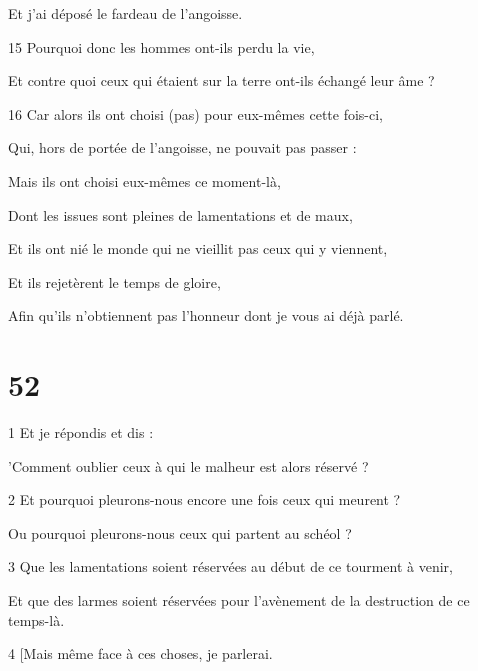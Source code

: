 \par Et j'ai déposé le fardeau de l'angoisse.

\par 15 Pourquoi donc les hommes ont-ils perdu la vie,

\par Et contre quoi ceux qui étaient sur la terre ont-ils échangé leur âme ?

\par 16 Car alors ils ont choisi (pas) pour eux-mêmes cette fois-ci,

\par Qui, hors de portée de l'angoisse, ne pouvait pas passer :

\par Mais ils ont choisi eux-mêmes ce moment-là,

\par Dont les issues sont pleines de lamentations et de maux,

\par Et ils ont nié le monde qui ne vieillit pas ceux qui y viennent,

\par Et ils rejetèrent le temps de gloire,

\par Afin qu'ils n'obtiennent pas l'honneur dont je vous ai déjà parlé.

\chapter{52}

\par 1 Et je répondis et dis :

\par 'Comment oublier ceux à qui le malheur est alors réservé ?

\par 2 Et pourquoi pleurons-nous encore une fois ceux qui meurent ?

\par Ou pourquoi pleurons-nous ceux qui partent au schéol ?

\par 3 Que les lamentations soient réservées au début de ce tourment à venir,

\par Et que des larmes soient réservées pour l'avènement de la destruction de ce temps-là.

\par 4 [Mais même face à ces choses, je parlerai.

